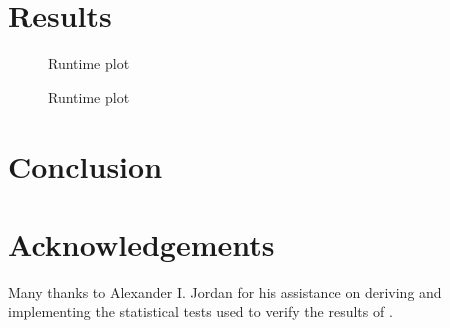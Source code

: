 \documentclass{article}
\begin{document}
\section{Results}

\begin{figure}
    \centering
    
    \caption{Runtime plot}\label{fig:runtime-taxa}
\end{figure}

\begin{figure}
    \centering
    
    \caption{Runtime plot}\label{fig:runtime-regions}
\end{figure}

\section{Conclusion}

\section{Acknowledgements}

Many thanks to Alexander I. Jordan for his assistance on deriving and
implementing the statistical tests used to verify the results of \bigrig{}.


\end{document}
